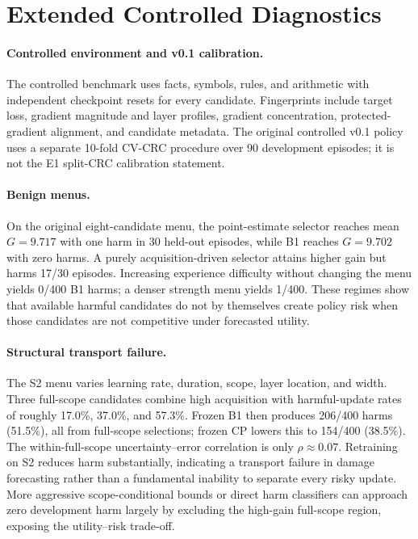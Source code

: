 \documentclass{article} %
\begin{document}
\section{Extended Controlled Diagnostics}
\label{app:controlled_details}

\paragraph{Controlled environment and v0.1 calibration.}
The controlled benchmark uses facts, symbols, rules, and arithmetic with
independent checkpoint resets for every candidate. Fingerprints include target
loss, gradient magnitude and layer profiles, gradient concentration,
protected-gradient alignment, and candidate metadata. The original controlled
v0.1 policy uses a separate 10-fold CV-CRC procedure over 90 development
episodes; it is not the E1 split-CRC calibration statement.

\paragraph{Benign menus.}
On the original eight-candidate menu, the point-estimate selector reaches mean
$G=9.717$ with one harm in 30 held-out episodes, while B1 reaches $G=9.702$
with zero harms. A purely acquisition-driven selector attains higher gain but
harms 17/30 episodes. Increasing experience difficulty without changing the
menu yields 0/400 B1 harms; a denser strength menu yields 1/400. These regimes
show that available harmful candidates do not by themselves create policy
risk when those candidates are not competitive under forecasted utility.

\paragraph{Structural transport failure.}
The S2 menu varies learning rate, duration, scope, layer location, and width.
Three full-scope candidates combine high acquisition with harmful-update rates
of roughly 17.0\%, 37.0\%, and 57.3\%. Frozen B1 then produces 206/400 harms
(51.5\%), all from full-scope selections; frozen CP lowers this to 154/400
(38.5\%). The within-full-scope uncertainty--error correlation is only
$\rho\approx0.07$. Retraining on S2 reduces harm substantially, indicating a
transport failure in damage forecasting rather than a fundamental inability
to separate every risky update. More aggressive scope-conditional bounds or
direct harm classifiers can approach zero development harm largely by
excluding the high-gain full-scope region, exposing the utility--risk trade-off.
\end{document}

